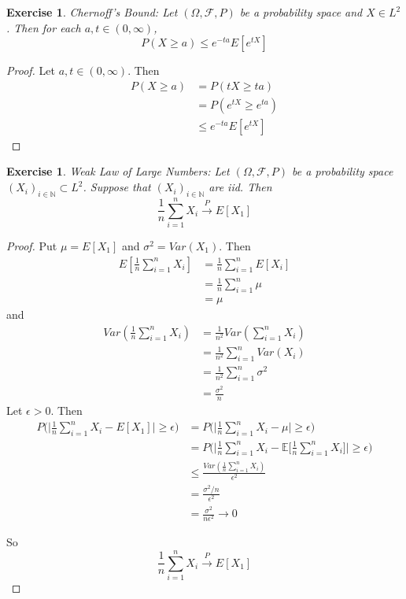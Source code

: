 \documentclass[12pt]{amsart}
\newtheorem{ex}[thm]{Exercise}
\newcommand{\ep}{\epsilon}
\newcommand{\sig}{\sigma}
\newcommand{\Om}{\Omega}
\newcommand{\N}{\mathbb{N}}
\newcommand{\E}{\mathbb{E}}
\newcommand{\MF}{\mathcal{F}}
\newcommand{\conv}[1]{\xrightarrow{#1}}
\begin{document}
\begin{ex}{Chernoff's Bound:}
	Let $(\Om, \MF, P)$ be a probability space and $X \in L^2$. Then for each $a, t \in (0, \infty)$, $$P( X \geq a) \leq e^{-ta}E[e^{tX}]$$
\end{ex}

\begin{proof}
	Let $a, t \in (0, \infty)$. Then 
	\begin{align*}
		P( X \geq a)
		&= P(tX \geq ta) \\
		&= P(e^{tX} \geq e^{ta}) \\
		& \leq e^{-ta}E[e^{tX}]
	\end{align*}
\end{proof}

\begin{ex}{Weak Law of Large Numbers:}
	Let $(\Om, \MF, P)$ be a probability space $(X_i)_{i\in \N} \subset L^2$. Suppose that $(X_i)_{i\in \N}$ are iid. Then $$\frac{1}{n}\sum_{i=1}^n X_i \conv{P} E[X_1]$$
\end{ex}

\begin{proof}
	Put $\mu = E[X_1]$ and $\sig^2 = Var(X_1)$. Then 
	\begin{align*}
		E[\frac{1}{n}\sum_{i=1}^n X_i] 
		&= \frac{1}{n} \sum_{i=1}^nE[X_i] \\
		&= \frac{1}{n} \sum_{i=1}^n \mu \\
		&= \mu
	\end{align*} and 
	\begin{align*}
		Var(\frac{1}{n}\sum_{i=1}^n X_i) 
		&= \frac{1}{n^2} Var(\sum_{i=1}^n X_i) \\
		&= \frac{1}{n^2} \sum_{i=1}^n Var(X_i) \\
		&= \frac{1}{n^2} \sum_{i=1}^n \sig^2 \\
		&= \frac{\sig^2}{n}
	\end{align*}
	Let $\ep >0$. Then 
	\begin{align*}
		P\bigg(\bigg \vert \frac{1}{n} \sum_{i=1}^n X_i - E[X_1] \bigg \vert \geq \ep \bigg) 
		& = P\bigg(\bigg\vert \frac{1}{n} \sum_{i=1}^n X_i - \mu \bigg\vert \geq \ep\bigg) \\
		& = P\bigg(\bigg\vert \frac{1}{n} \sum_{i=1}^n X_i - \E\bigg[\frac{1}{n}\sum_{i=1}^n X_i \bigg] \bigg\vert \geq \ep\bigg) \\ 
		&\leq \frac{Var(\frac{1}{n} \sum_{i=1}^n X_i)}{\ep^2} \\
		& =  \frac{\sig^2 / n}{\ep^2} \\
		&= \frac{\sig^2}{n\ep^2} \rightarrow 0
	\end{align*}
	
	So $$\frac{1}{n}\sum_{i=1}^n X_i \conv{P} E[X_1]$$
\end{proof}
\end{document}
